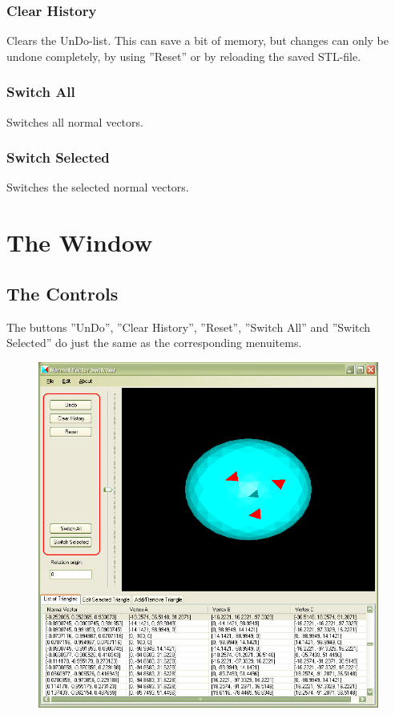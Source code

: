 \subsection{Clear History}
Clears the UnDo-list. This can save a bit of memory, but changes can only be undone completely, by using ''Reset'' or by reloading the saved STL-file.

\subsection{Switch All}
Switches all normal vectors.

\subsection{Switch Selected}
Switches the selected normal vectors.

\chapter{The Window}

\section{The Controls}

The buttons ''UnDo'', ''Clear History'', ''Reset'', ''Switch All'' and ''Switch Selected'' do just the same as the corresponding menuitems. 

\begin{figure}[hb]
	\centering
	\includegraphics[width=0.9\linewidth]{window2}
\end{figure}

